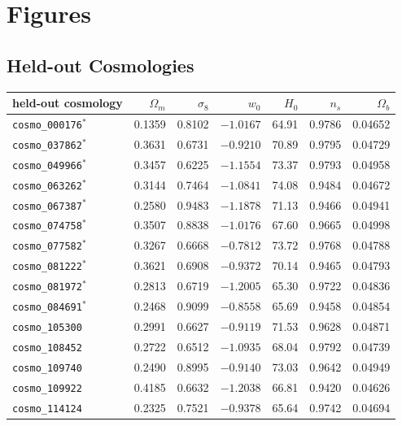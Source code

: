 \documentclass{report}
\begin{document}
\printbibliography
\appendix
\chapter{Figures}\label{app:figures}
\section{Held-out Cosmologies}
\begin{table}[h!]
\centering
\scriptsize
\begin{tabular}{@{}lrrrrrr@{}}
\toprule
held-out cosmology & $\Omega_m$ & $\sigma_8$ & $w_0$ & $H_0$ & $n_s$ & $\Omega_b$ \\
\midrule
\texttt{cosmo\_000176}$^\ast$ & 0.1359 & 0.8102 & $-1.0167$ & 64.91 & 0.9786 & 0.04652 \\
\texttt{cosmo\_037862}$^\ast$ & 0.3631 & 0.6731 & $-0.9210$ & 70.89 & 0.9795 & 0.04729 \\
\texttt{cosmo\_049966}$^\ast$ & 0.3457 & 0.6225 & $-1.1554$ & 73.37 & 0.9793 & 0.04958 \\
\texttt{cosmo\_063262}$^\ast$ & 0.3144 & 0.7464 & $-1.0841$ & 74.08 & 0.9484 & 0.04672 \\
\texttt{cosmo\_067387}$^\ast$ & 0.2580 & 0.9483 & $-1.1878$ & 71.13 & 0.9466 & 0.04941 \\
\texttt{cosmo\_074758}$^\ast$ & 0.3507 & 0.8838 & $-1.0176$ & 67.60 & 0.9665 & 0.04998 \\
\texttt{cosmo\_077582}$^\ast$ & 0.3267 & 0.6668 & $-0.7812$ & 73.72 & 0.9768 & 0.04788 \\
\texttt{cosmo\_081222}$^\ast$ & 0.3621 & 0.6908 & $-0.9372$ & 70.14 & 0.9465 & 0.04793 \\
\texttt{cosmo\_081972}$^\ast$ & 0.2813 & 0.6719 & $-1.2005$ & 65.30 & 0.9722 & 0.04836 \\
\texttt{cosmo\_084691}$^\ast$ & 0.2468 & 0.9099 & $-0.8558$ & 65.69 & 0.9458 & 0.04854 \\
\texttt{cosmo\_105300} & 0.2991 & 0.6627 & $-0.9119$ & 71.53 & 0.9628 & 0.04871 \\
\texttt{cosmo\_108452} & 0.2722 & 0.6512 & $-1.0935$ & 68.04 & 0.9792 & 0.04739 \\
\texttt{cosmo\_109740} & 0.2490 & 0.8995 & $-0.9140$ & 73.03 & 0.9642 & 0.04949 \\
\texttt{cosmo\_109922} & 0.4185 & 0.6632 & $-1.2038$ & 66.81 & 0.9420 & 0.04626 \\
\texttt{cosmo\_114124} & 0.2325 & 0.7521 & $-0.9378$ & 65.64 & 0.9742 & 0.04694 \\

\end{tabular}
\end{table}
\end{document}
